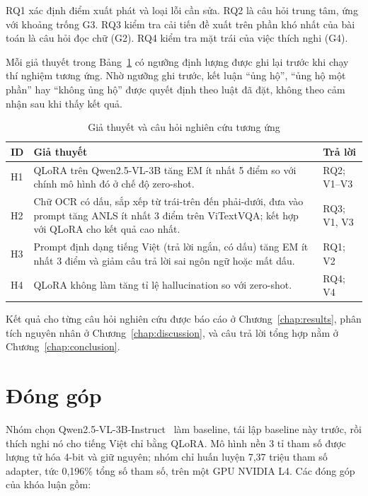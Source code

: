 RQ1 xác định điểm xuất phát và loại lỗi cần sửa. RQ2 là câu hỏi trung tâm, ứng
với khoảng trống G3. RQ3 kiểm tra cải tiến đề xuất trên phần khó nhất của bài
toán là câu hỏi đọc chữ (G2). RQ4 kiểm tra mặt trái của việc thích nghi (G4).

Mỗi giả thuyết trong Bảng~\ref{tab:hypotheses} có ngưỡng định lượng được ghi lại
trước khi chạy thí nghiệm tương ứng. Nhờ ngưỡng ghi trước, kết luận ``ủng hộ'',
``ủng hộ một phần'' hay ``không ủng hộ'' được quyết định theo luật đã đặt, không
theo cảm nhận sau khi thấy kết quả.

\begin{table}[htbp]
\caption{Giả thuyết và câu hỏi nghiên cứu tương ứng}
\label{tab:hypotheses}
\centering
\small
\begin{tabular}{p{}p{}p{}}
\toprule
\textbf{ID} & \textbf{Giả thuyết} & \textbf{Trả lời} \\
\midrule
H1 & QLoRA trên Qwen2.5-VL-3B tăng EM ít nhất 5 điểm so với chính mô hình đó ở
chế độ zero-shot. & RQ2; V1--V3 \\
H2 & Chữ OCR có dấu, sắp xếp từ trái-trên đến phải-dưới, đưa vào prompt tăng
ANLS ít nhất 3 điểm trên ViTextVQA; kết hợp với QLoRA cho kết quả cao nhất. &
RQ3; V1, V3 \\
H3 & Prompt định dạng tiếng Việt (trả lời ngắn, có dấu) tăng EM ít nhất 3 điểm
và giảm câu trả lời sai ngôn ngữ hoặc mất dấu. & RQ1; V2 \\
H4 & QLoRA không làm tăng tỉ lệ hallucination so với zero-shot. & RQ4; V4 \\
\bottomrule
\end{tabular}
\end{table}

Kết quả cho từng câu hỏi nghiên cứu được báo cáo ở Chương~\ref{chap:results},
phân tích nguyên nhân ở Chương~\ref{chap:discussion}, và câu trả lời tổng hợp nằm
ở Chương~\ref{chap:conclusion}.

\section{Đóng góp}
\label{sec:intro-contrib}

Nhóm chọn Qwen2.5-VL-3B-Instruct~\cite{bai2025qwen25vl} làm baseline, tái lập
baseline này trước, rồi thích nghi nó cho tiếng Việt chỉ bằng QLoRA. Mô hình nền
3 tỉ tham số được lượng tử hóa 4-bit và giữ nguyên; nhóm chỉ huấn luyện 7,37
triệu tham số adapter, tức 0,196\% tổng số tham số, trên một GPU NVIDIA L4. Các
đóng góp của khóa luận gồm:

